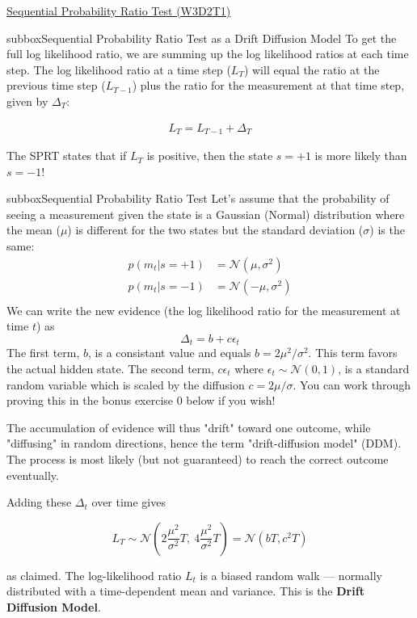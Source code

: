 \begin{textbox}{\href{https://compneuro.neuromatch.io/tutorials/W3D2_HiddenDynamics/student/W3D2_Tutorial1.html}{Sequential Probability Ratio Test (W3D2T1)}   }

\begin{subbox}{subbox}{Sequential Probability Ratio Test as a Drift Diffusion Model}
\scriptsize
To get the full log likelihood ratio, we are summing up the log likelihood ratios at each time step. The log likelihood ratio at a time step ($L_T$) will equal the ratio at the previous time step ($L_{T-1}$) plus the ratio for the measurement at that time step, given by $\Delta_T$:

\begin{align*}
L_T =  L_{T-1} + \Delta_T
\end{align*}

The SPRT states that if $L_T$ is positive, then the state $s=+1$ is more likely than $s=-1$! 

\end{subbox}

\begin{subbox}{subbox}{Sequential Probability Ratio Test}
\scriptsize
Let's assume that the probability of seeing a measurement given the state is a Gaussian (Normal) distribution where the mean ($\mu$) is different for the two states but the standard deviation ($\sigma$) is the same:
\begin{align*}
p(m_t | s = +1) &= \mathcal{N}(\mu, \sigma^2)\\
p(m_t | s = -1) &= \mathcal{N}(-\mu, \sigma^2)\\
\end{align*}
We can write the new evidence (the log likelihood ratio for the measurement at time $t$) as
$$\Delta_t=b+c\epsilon_t$$
The first term, $b$, is a consistant value and equals $b=2\mu^2/\sigma^2$. This term favors the actual hidden state. The second term, $c\epsilon_t$ where $\epsilon_t\sim\mathcal{N}(0,1)$, is a standard random variable which is scaled by the diffusion $c=2\mu/\sigma$. You can work through proving this in the bonus exercise 0 below if you wish!

The accumulation of evidence will thus "drift" toward one outcome, while "diffusing" in random directions, hence the term "drift-diffusion model" (DDM). The process is most likely (but not guaranteed) to reach the correct outcome eventually.

Adding these $\Delta_t$ over time gives

\begin{equation*}
L_T\sim\mathcal{N}\left(2\frac{\mu^2}{\sigma^2}T,\ 4\frac{\mu^2}{\sigma^2}T\right)=\mathcal{N}(bT,c^2T)
\end{equation*}

as claimed. The log-likelihood ratio $L_t$ is a biased random walk --- normally distributed with a time-dependent mean and variance. This is the \textbf{Drift Diffusion Model}.

\end{subbox}
\end{textbox}
